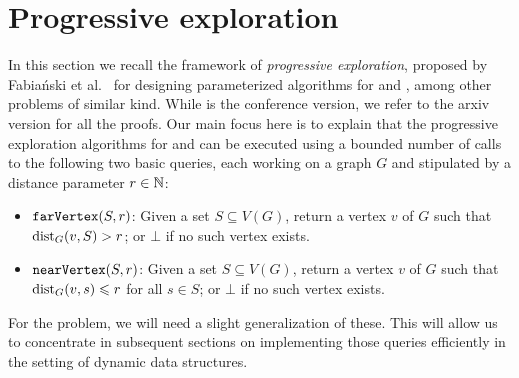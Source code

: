 \section{Progressive exploration}\label{sec:ladders}

In this section we recall the framework of \emph{progressive exploration}, proposed by Fabia\'nski et al.~\cite{FabianskiPST19,Fabianski2018arxiv} for  designing parameterized algorithms for  and , among other problems of similar kind. While \cite{FabianskiPST19} is the conference version, we refer to the arxiv version \cite{Fabianski2018arxiv} for all the proofs. Our main focus here is to explain that the progressive exploration algorithms for  and  can be executed using a bounded number of calls to the following two basic queries, each working on a graph $G$ and stipulated by a distance parameter $r\in \mathbb{N}$:
\begin{itemize}
	\item $\mathtt{farVertex}(S,r)$: Given a set $S \subseteq V(G)$, return a vertex $v$ of $G$ such that $\mathrm{dist}_G(v,S)>r$; or $\bot$ if no such vertex exists.
	\item $\mathtt{nearVertex}(S,r)$: Given a set $S \subseteq V(G)$, return a vertex $v$ of $G$ such that $\mathrm{dist}_G(v,s)\leqslant r$ for all $s\in S$; or $\bot$ if no such vertex exists.
\end{itemize}
For the  problem, we will need a slight generalization of these.
This will allow us to concentrate in subsequent sections on implementing those queries efficiently in the setting of dynamic data structures.

